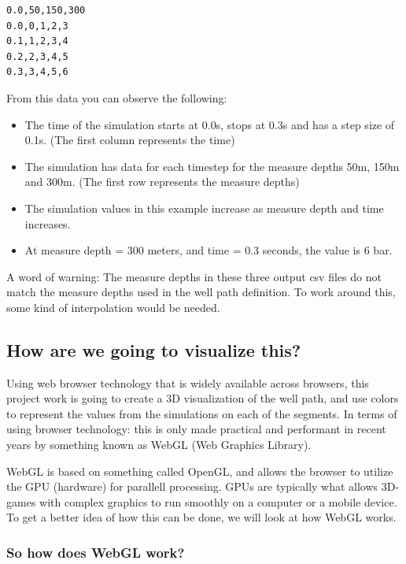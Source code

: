 \begin{verbatim}
0.0,50,150,300
0.0,0,1,2,3
0.1,1,2,3,4
0.2,2,3,4,5
0.3,3,4,5,6
\end{verbatim}

From this data you can observe the following:

\begin{itemize}
\tightlist
\item
  The time of the simulation starts at 0.0s, stops at 0.3s and has a
  step size of 0.1s. (The first column represents the time)
\item
  The simulation has data for each timestep for the measure depths 50m,
  150m and 300m. (The first row represents the measure depths)
\item
  The simulation values in this example increase as measure depth and
  time increases.
\item
  At measure depth = 300 meters, and time = 0.3 seconds, the value is 6
  bar.
\end{itemize}

A word of warning: The measure depths in these three output csv files do
not match the measure depths used in the well path definition. To work
around this, some kind of interpolation would be needed.

\hypertarget{how-are-we-going-to-visualize-this}{%
\subsection{How are we going to visualize
this?}\label{how-are-we-going-to-visualize-this}}

Using web browser technology that is widely available across browsers,
this project work is going to create a 3D visualization of the well
path, and use colors to represent the values from the simulations on
each of the segments. In terms of using browser technology: this is only
made practical and performant in recent years by something known as
WebGL (Web Graphics Library). \label{webgl}

WebGL is based on something called OpenGL, and allows the browser to
utilize the GPU (hardware) for parallell processing. GPUs are typically
what allows 3D-games with complex graphics to run smoothly on a computer
or a mobile device. To get a better idea of how this can be done, we
will look at how WebGL works.

\hypertarget{so-how-does-webgl-work}{%
\subsubsection{So how does WebGL work?}\label{so-how-does-webgl-work}}

